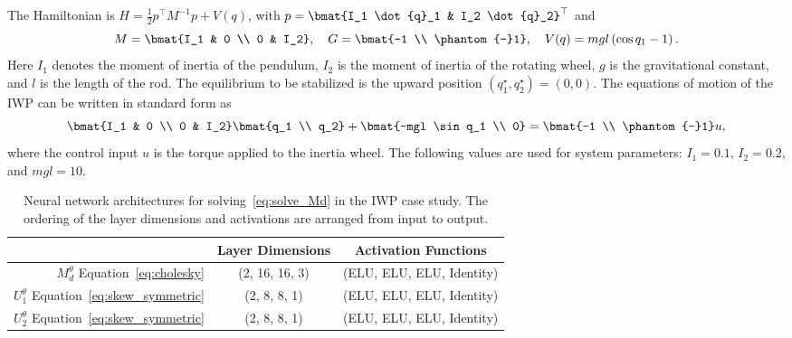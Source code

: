 The Hamiltonian is $H = \frac{1}{2} p^\top M^{-1} p + V(q)$, with $p = \bmat{I_1
\dot{q}_1 & I_2 \dot{q}_2}^\top$ and
%
\begin{equation*}
    M = \bmat{I_1 & 0 \\ 0 & I_2},
    \quad
    G = \bmat{-1 \\ \phantom{-}1},
    \quad
    V(q) = mgl \left( \cos q_1 - 1 \right).
\end{equation*}
%
Here \(I_1\) denotes the moment of inertia of the pendulum, \(I_2\) is the moment of
inertia of the rotating wheel, \(g\) is the gravitational constant, and $l$ is
the length of the rod. The equilibrium to be stabilized is the upward position $(q_1^\star, q_2^\star) = (0, 0)$.
%
The equations of motion of the IWP can be written in standard form as 
%
\begin{equation*}
    \bmat{I_1 & 0 \\ 0 & I_2} \bmat{q_1 \\ q_2} + \bmat{-mgl \sin q_1 \\ 0} = \bmat{-1 \\ \phantom{-}1} u, 
\end{equation*}
%
where the control input \(u\) is the torque applied to the inertia wheel.
%
The following values are used for system parameters: \(I_1
= 0.1,\, I_2 = 0.2\), and $mgl = 10$. 


\begin{table}[b]
    \caption{Neural network architectures for solving~\eqref{eq:solve_Md} in the IWP case study. The ordering of the layer dimensions and activations are arranged from input to output. }
    \centering
    \begin{tabular}{r|c|c}
         & Layer Dimensions  & Activation Functions \\ \hline
        $M_d^\theta$ Equation~\eqref{eq:cholesky} & (2, 16, 16, 3) & (ELU, ELU, ELU, Identity) \\
        $U_1^\theta$ Equation~\eqref{eq:skew_symmetric} & (2, 8, 8, 1) & (ELU, ELU, ELU, Identity) \\
        $U_2^\theta$ Equation~\eqref{eq:skew_symmetric} & (2, 8, 8, 1) & (ELU, ELU, ELU, Identity) \\ 
    \end{tabular}
    \label{tab:iwp_nn}
\end{table}

